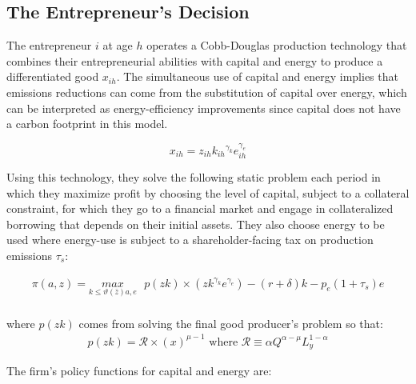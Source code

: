 \documentclass[12pt,a4paper]{article}
\begin{document}
\subsection{\normalsize The Entrepreneur's Decision}

\hspace*{6mm} The entrepreneur  $i$ at age $h$ operates a Cobb-Douglas production technology that combines their entrepreneurial abilities with capital and energy to produce a differentiated good $x_{ih}$. The simultaneous use of capital and energy implies that emissions reductions can come from the substitution of capital over energy, which can be interpreted as energy-efficiency improvements since capital does not have a carbon footprint in this model.

\begin{equation}
x_{ih}=z_{ih}k_{ih}{}^{\gamma_k}e_{ih}^{\gamma_e}
\end{equation}

  Using this technology, they solve the following static problem each period in which they maximize profit by choosing the level of capital, subject to a collateral constraint, for which they go to a financial market and engage in collateralized borrowing that depends on their initial assets. They also choose energy to be used where energy-use is subject to a shareholder-facing tax on production emissions $\tau_s$:


      \[
\begin{array}{ll}

\pi(a,z) = \underset{k \le \vartheta(\bar{z})a, e }{max } \text{ } p(zk)\times (zk^{\gamma_k} e^{\gamma_e}) - (r+\delta) k - p_e(1+\tau_s)e \\

\end{array}
\]


 
where $p(zk)$ comes from solving the final good producer's problem so that:
      \[
\begin{array}{ll}

 p(zk)= \mathcal{R} \times (x)^{\mu-1} \text{ where } \mathcal{R} \equiv \alpha Q^{\alpha-\mu} L_y^{1-\alpha} 
 \end{array}
\]

The firm's policy functions for capital and energy are:

%
%     
     
\end{document}
